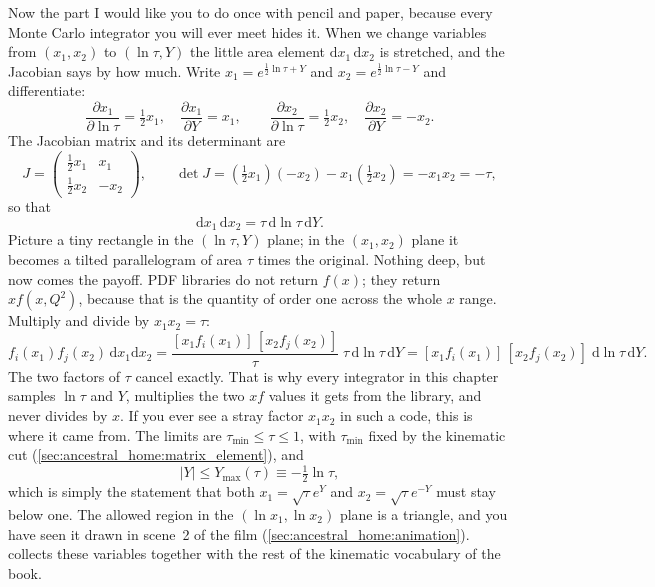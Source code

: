 Now the part I would like you to do once with pencil and paper, because
every Monte Carlo integrator you will ever meet hides it. When we change
variables from $(x_1,x_2)$ to $(\ln\tau,Y)$ the little area element
$\mathrm{d}x_1\,\mathrm{d}x_2$ is stretched, and the Jacobian says by how
much. Write $x_1=e^{\frac12\ln\tau+Y}$ and $x_2=e^{\frac12\ln\tau-Y}$ and
differentiate:
\begin{equation}
  \frac{\partial x_1}{\partial\ln\tau}=\tfrac12x_1,\quad
  \frac{\partial x_1}{\partial Y}=x_1,\qquad
  \frac{\partial x_2}{\partial\ln\tau}=\tfrac12x_2,\quad
  \frac{\partial x_2}{\partial Y}=-x_2 .
\end{equation}
The Jacobian matrix and its determinant are
\begin{equation}
  J=\begin{pmatrix}\tfrac12x_1 & x_1\\[2pt] \tfrac12x_2 & -x_2\end{pmatrix},
  \qquad
  \det J=\left(\tfrac12x_1\right)(-x_2)-x_1\left(\tfrac12x_2\right)=-x_1x_2=-\tau,
\end{equation}
so that
\begin{equation}
  \mathrm{d}x_1\,\mathrm{d}x_2=\tau\,\mathrm{d}\ln\tau\,\mathrm{d}Y .
  \label{eq:ancestral_home:jacobian}
\end{equation}
Picture a tiny rectangle in the $(\ln\tau,Y)$ plane; in the $(x_1,x_2)$
plane it becomes a tilted parallelogram of area $\tau$ times the original.
Nothing deep, but now comes the payoff. PDF libraries do not return $f(x)$;
they return $x f(x,Q^2)$, because that is the quantity of order one across
the whole $x$ range. Multiply and divide by $x_1x_2=\tau$:
\begin{equation}
  f_i(x_1)f_j(x_2)\,\mathrm{d}x_1\mathrm{d}x_2
  = \frac{[x_1f_i(x_1)]\,[x_2f_j(x_2)]}{\tau}\;\tau\,\mathrm{d}\ln\tau\,\mathrm{d}Y
  = [x_1f_i(x_1)]\,[x_2f_j(x_2)]\;\mathrm{d}\ln\tau\,\mathrm{d}Y .
  \label{eq:ancestral_home:xf}
\end{equation}
The two factors of $\tau$ cancel exactly. That is why every integrator in this
chapter samples $\ln\tau$ and $Y$, multiplies the two $xf$ values it gets
from the library, and never divides by $x$. If you ever see a stray factor
$x_1x_2$ in such a code, this is where it came from. The limits are
$\tau_{\min}\le\tau\le1$, with $\tau_{\min}$ fixed by the kinematic cut
(\cref{sec:ancestral_home:matrix_element}), and
\begin{equation}
  |Y|\le Y_{\max}(\tau)\equiv-\tfrac12\ln\tau ,
  \label{eq:ancestral_home:ymax}
\end{equation}
which is simply the statement that both $x_1=\sqrt\tau e^{Y}$ and
$x_2=\sqrt\tau e^{-Y}$ must stay below one. The allowed region in the
$(\ln x_1,\ln x_2)$ plane is a triangle, and you have seen it drawn in
scene~2 of the film (\cref{sec:ancestral_home:animation}).  collects these
variables together with the rest of the kinematic vocabulary of the book.

